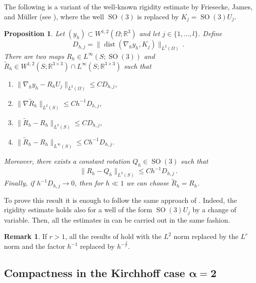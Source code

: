 \documentclass{article}
\theoremstyle{plain}
\theoremstyle{plain}
\theoremstyle{plain}
\theoremstyle{plain}
\theoremstyle{plain}
\newtheorem{prop}[teo]{Proposition}
\theoremstyle{definition}
\newtheorem{remark}[teo]{Remark}
\theoremstyle{definition}
\renewcommand{\r}{\mathbb{R}}
\DeclareMathOperator{\SO}{SO}
\DeclareMathOperator{\dist}{dist}
\begin{document}
The following is a variant of the well-known rigidity estimate by Friesecke, James, and M\"uller (see \cite{FRIESECKE2002, FRIESECKE2006}), where the well $\SO(3)$ is replaced by $K_j = \SO(3)U_j$.

\begin{prop}\label{prop:approximated_rotation}
    Let $(y_h) \subset W^{1,2}(\Omega; \r^3)$ and let $j \in \{1, \dots, l\}$. Define
    \[
        D_{h, j} = \| \dist(\nabla_h y_h, K_j) \|_{L^2(\Omega)}\,.
    \]
    There are two maps $R_h \in L^\infty(S; \SO(3))$ and $\tilde R_h \in W^{1,2}(S; \r^{3 \times 3}) \cap L^\infty(S; \r^{3 \times 3})$ such that
    \begin{enumerate}[start=1,label={(R\arabic*)}]
        \item $\|\nabla_h y_h - R_h U_j\|_{L^2(\Omega)} \leq C D_{h, j}$\label{item:approximated_rotation_convergence_scaled_gradient},
        \item $\|\nabla \tilde R_h\|_{L^2(S)} \leq C h^{-1}D_{h, j}$\label{item:approximated_rotation_convergence_gradient},
        \item $\|\tilde R_h - R_h\|_{L^2(S)} \leq C D_{h, j}$,
        \item $\|\tilde R_h - R_h\|_{L^\infty(S)} \leq C h^{-1}D_{h, j}$.
    \end{enumerate}
    Moreover, there exists a constant rotation $Q_h \in \SO(3)$ such that
    \begin{equation}
        \|R_h - Q_h\|_{L^2(S)} \leq Ch^{-1}D_{h, j} \,.\label{eq:approximated_constant_rotation}
    \end{equation}
    Finally, if $h^{-1}D_{h, j} \to 0$, then for $h \ll 1$ we can choose $\tilde R_h = R_h$.
\end{prop}

To prove this result it is enough to follow the same approach of \cite{FRIESECKE2006}. Indeed, the rigidity estimate \cite[Theorem 5]{FRIESECKE2006} holds also for a well of the form $\SO(3)U_j$ by a change of variable. Then, all the estimates in \cite[Theorem 6]{FRIESECKE2006} can be carried out in the same fashion.

\begin{remark}\label{remark:approximated_rotation_Lr}
	If $ r > 1 $, all the results of  hold with the $L^2$ norm replaced by the $L^r$ norm and the factor $h^{-1}$ replaced by $h^{-\frac{2}{r}}$.
\end{remark}

\subsection{Compactness in the Kirchhoff case \texorpdfstring{$\bm{\alpha= 2}$}{ = 2}}
\end{document}
